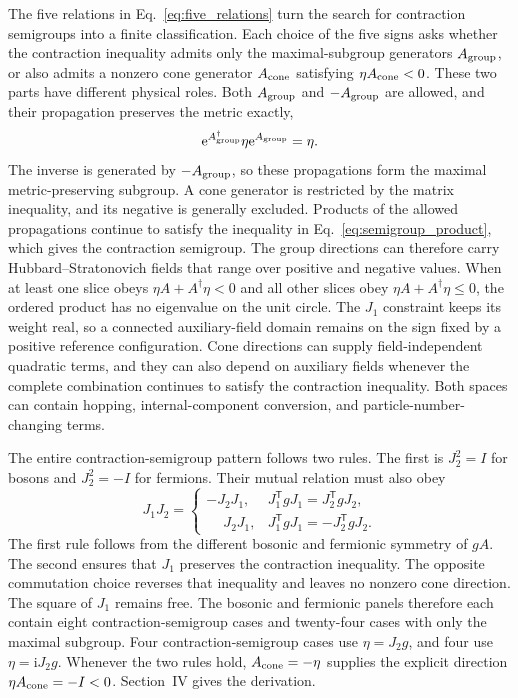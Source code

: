 \documentclass[onecolumn,aps,prb,amsmath,amssymb,superscriptaddress,longbibliography,floatfix]{revtex4-2}
\newcommand{\ee}{\mathrm{e}}
\newcommand{\ii}{\mathrm{i}}
\newcommand{\trans}{\mathsf{T}}
\begin{document}
The five relations in Eq.~\eqref{eq:five_relations} turn the search for
contraction semigroups into a finite classification.  Each choice of the five
signs asks whether the contraction inequality admits only the maximal-subgroup
generators \(A_{\rm group}\), or also admits a nonzero cone generator
\(A_{\rm cone}\) satisfying \(\eta A_{\rm cone}<0\).  These two parts have
different physical roles.  Both \(A_{\rm group}\) and \(-A_{\rm group}\) are
allowed, and their propagation preserves the metric exactly,
\begin{equation*}
    \ee^{A_{\rm group}^\dagger}\eta\ee^{A_{\rm group}}=\eta.
\end{equation*}
The inverse is generated by \(-A_{\rm group}\), so these propagations form the
maximal metric-preserving subgroup.  A cone generator is restricted by the
matrix inequality, and its negative is generally excluded.  Products of the
allowed propagations continue to satisfy the inequality in
Eq.~\eqref{eq:semigroup_product}, which gives the contraction semigroup.  The
group directions can therefore carry Hubbard--Stratonovich fields that range
over positive and negative values.  When at least one slice obeys
\(\eta A+A^\dagger\eta<0\) and all other slices obey
\(\eta A+A^\dagger\eta\leq0\), the ordered product has no eigenvalue on the
unit circle.  The \(J_1\) constraint keeps its weight real, so a connected
auxiliary-field domain remains on the sign fixed by a positive reference
configuration.  Cone directions can supply field-independent quadratic terms,
and they can also depend on auxiliary fields whenever the complete combination
continues to satisfy the contraction inequality.  Both spaces can contain
hopping, internal-component conversion, and particle-number-changing terms.

The entire contraction-semigroup pattern follows two rules.  The first is
\(J_2^2=I\) for bosons and \(J_2^2=-I\) for fermions.  Their mutual relation
must also obey
\begin{equation}
J_1J_2=
\begin{cases}
-J_2J_1,&J_1^\trans gJ_1=J_2^\trans gJ_2,\\
\phantom{-}J_2J_1,&J_1^\trans gJ_1=-J_2^\trans gJ_2.
\end{cases}
\label{eq:J1J2_cone_rule}
\end{equation}
The first rule follows from the different bosonic and fermionic symmetry of
\(gA\).  The second ensures that \(J_1\) preserves the contraction inequality.
The opposite commutation choice reverses that inequality and leaves no nonzero
cone direction.  The square of \(J_1\) remains free.  The bosonic and fermionic
panels therefore each contain eight contraction-semigroup cases and twenty-four
cases with only the maximal subgroup.  Four contraction-semigroup cases use
\(\eta=J_2g\), and four use \(\eta=\ii J_2g\).  Whenever the two rules hold,
\(A_{\rm cone}=-\eta\) supplies the explicit direction
\(\eta A_{\rm cone}=-I<0\).  Section~IV gives the derivation.
\end{document}
